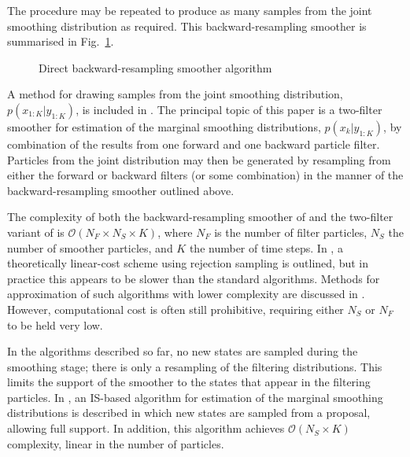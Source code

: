 \documentclass[10pt,twocolumn,twoside]{IEEEtran}
\begin{document}
The procedure may be repeated to produce as many samples from the joint smoothing distribution as required. This backward-resampling smoother is summarised in Fig.~\ref{alg:DBRS}.

\begin{figure}
\caption{Direct backward-resampling smoother algorithm}
\label{alg:DBRS}
\end{figure}

A method for drawing samples from the joint smoothing distribution, $p(x_{1:K}|y_{1:K})$, is included in \cite{Briers2010}. The principal topic of this paper is a two-filter smoother for estimation of the marginal smoothing distributions, $p(x_{k}|y_{1:K})$, by combination of the results from one forward and one backward particle filter. Particles from the joint distribution may then be generated by resampling from either the forward or backward filters (or some combination) in the manner of the backward-resampling smoother outlined above.%

The complexity of both the backward-resampling smoother of \cite{Godsill2004} and the two-filter variant of \cite{Briers2010} is $\mathcal{O}(N_F \times N_S \times K)$, where $N_F$ is the number of filter particles, $N_S$ the number of smoother particles, and $K$ the number of time steps. In \cite{Douc2009}, a theoretically linear-cost scheme using rejection sampling is outlined, but in practice this appears to be slower than the standard algorithms. Methods for approximation of such algorithms with lower complexity are discussed in \cite{Klaas2006}. However, computational cost is often still prohibitive, requiring either $N_S$ or $N_F$ to be held very low.

In the algorithms described so far, no new states are sampled during the smoothing stage; there is only a resampling of the filtering distributions. This limits the support of the smoother to the states that appear in the filtering particles. In \cite{Fearnhead2010}, an IS-based algorithm for estimation of the marginal smoothing distributions is described in which new states are sampled from a proposal, allowing full support. In addition, this algorithm achieves $\mathcal{O}( N_S \times K)$ complexity, linear in the number of particles.
\end{document}
